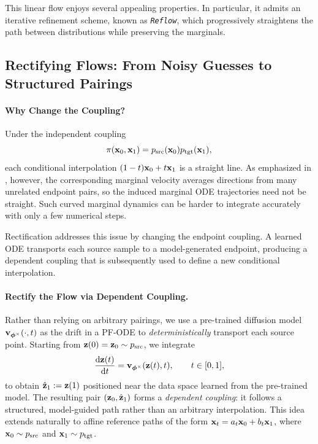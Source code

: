 This linear flow enjoys several appealing properties. 
In particular, it admits an iterative refinement scheme, known as \emph{\texttt{Reflow}}, 
which progressively straightens the path between distributions while preserving the marginals. 





\subsection{Rectifying Flows: From Noisy Guesses to Structured Pairings}\label{subsec:rectify}

\paragraph{Why Change the Coupling?}
Under the independent coupling
\[
\pi({\mathbf{x}}_0,{\mathbf{x}}_1)
=
p_{\mathrm{src}}({\mathbf{x}}_0)
p_{\mathrm{tgt}}({\mathbf{x}}_1),
\]
each conditional interpolation
$(1-t){\mathbf{x}}_0+t{\mathbf{x}}_1$ is a straight line. As emphasized in
, however, the corresponding marginal velocity
averages directions from many unrelated endpoint pairs, so the induced
marginal ODE trajectories need not be straight. Such curved marginal dynamics
can be harder to integrate accurately with only a few numerical steps.

Rectification addresses this issue by changing the endpoint coupling. A
learned ODE transports each source sample to a model-generated endpoint,
producing a dependent coupling that is subsequently used to define a new
conditional interpolation.

\paragraph{Rectify the Flow via Dependent Coupling.}
Rather than relying on arbitrary pairings, we use a pre-trained diffusion model ${\mathbf{v}}_{{\bm{\phi}}^\times}(\cdot,t)$ as the drift in a PF-ODE to \emph{deterministically} transport each source point. Starting from ${\mathbf{z}}(0)={\mathbf{z}}_0 \sim p_{\text{src}}$, we integrate
\[
\frac{\mathop{}\!\mathrm{d} {\mathbf{z}}(t)}{\mathop{}\!\mathrm{d} t} = {\mathbf{v}}_{{\bm{\phi}}^\times}({\mathbf{z}}(t),t), \qquad t \in [0,1],
\]
to obtain $\hat{{\mathbf{z}}}_1 := {\mathbf{z}}(1)$ positioned near the data space learned from the pre-trained model. The resulting pair $({\mathbf{z}}_0,\hat{{\mathbf{z}}}_1)$ forms a \emph{dependent coupling}: it follows a structured, model-guided path rather than an arbitrary interpolation. This idea extends naturally to affine reference paths of the form ${\mathbf{x}}_t = a_t {\mathbf{x}}_0 + b_t {\mathbf{x}}_1$, where ${\mathbf{x}}_0 \sim p_{\text{src}}$ and ${\mathbf{x}}_1 \sim p_{\text{tgt}}$.



